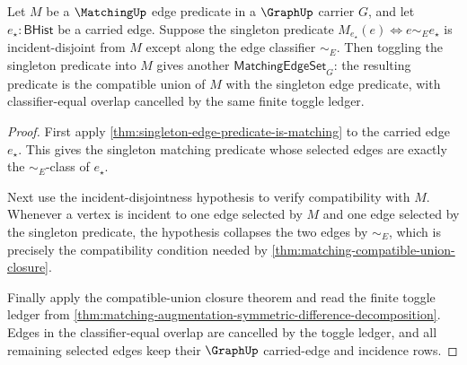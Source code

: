 \begin{theorem}
\label{thm:matching-augmenting-edge-toggle-closure}
Let $M$ be a $\MatchingUp$ edge predicate in a $\GraphUp$ carrier $G$, and let
$e_\star:\mathsf{BHist}$ be a carried edge. Suppose the singleton predicate
$M_{e_\star}(e)\Longleftrightarrow e\sim_E e_\star$ is incident-disjoint from
$M$ except along the edge classifier $\sim_E$. Then toggling the singleton
predicate into $M$ gives another $\mathsf{MatchingEdgeSet}_G$: the resulting predicate
is the compatible union of $M$ with the singleton edge predicate, with
classifier-equal overlap cancelled by the same finite toggle ledger.
\end{theorem}
\begin{proof}
First apply \autoref{thm:singleton-edge-predicate-is-matching} to the carried
edge $e_\star$. This gives the singleton matching predicate whose selected
edges are exactly the $\sim_E$-class of $e_\star$.

Next use the incident-disjointness hypothesis to verify compatibility with
$M$. Whenever a vertex is incident to one edge selected by $M$ and one edge
selected by the singleton predicate, the hypothesis collapses the two edges by
$\sim_E$, which is precisely the compatibility condition needed by
\autoref{thm:matching-compatible-union-closure}.

Finally apply the compatible-union closure theorem and read the finite toggle
ledger from
\autoref{thm:matching-augmentation-symmetric-difference-decomposition}. Edges
in the classifier-equal overlap are cancelled by the toggle ledger, and all
remaining selected edges keep their $\GraphUp$ carried-edge and incidence
rows.
\end{proof}

